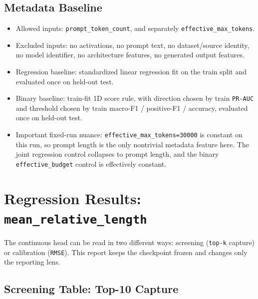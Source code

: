 \documentclass[11pt]{article}
\begin{document}
\subsection*{Metadata Baseline}
\begin{itemize}[leftmargin=1.5em]
\item Allowed inputs: \texttt{prompt\_token\_count}, and separately \texttt{effective\_max\_tokens}.
\item Excluded inputs: no activations, no prompt text, no dataset/source identity, no model identifier, no architecture features, no generated output features.
\item Regression baseline: standardized linear regression fit on the train split and evaluated once on held-out test.
\item Binary baseline: train-fit 1D score rule, with direction chosen by train \texttt{PR-AUC} and threshold chosen by train macro-F1 / positive-F1 / accuracy, evaluated once on held-out test.
\item Important fixed-run nuance: \texttt{effective\_max\_tokens=30000} is constant on this run, so prompt length is the only nontrivial metadata feature here. The joint regression control collapses to prompt length, and the binary \texttt{effective\_budget} control is effectively constant.
\end{itemize}

\section*{Regression Results: \texttt{mean\_relative\_length}}
The continuous head can be read in two different ways: screening (\texttt{top-k} capture) or calibration (\texttt{RMSE}). This report keeps the checkpoint frozen and changes only the reporting lens.

\subsection*{Screening Table: Top-10 Capture}
\begin{center}
\small
\setlength{\tabcolsep}{4pt}
\end{center}
\end{document}
